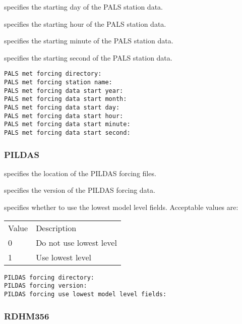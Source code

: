   specifies the starting
 day of the PALS station data.

  specifies the starting
 hour of the PALS station data.

  specifies the starting
 minute of the PALS station data.

  specifies the starting
 second of the PALS station data.
 

 \begin{Verbatim}[frame=single]
PALS met forcing directory:
PALS met forcing station name:
PALS met forcing data start year:
PALS met forcing data start month:
PALS met forcing data start day:
PALS met forcing data start hour:
PALS met forcing data start minute:
PALS met forcing data start second:
 \end{Verbatim}

 
 \subsubsection{PILDAS} \label{sssec:pildas}
 

 
  specifies the location of the
 PILDAS forcing files.

  specifies the version of the
 PILDAS forcing data.

  specifies
 whether to use the lowest model level fields.
 Acceptable values are:

 \begin{tabular}{ll}
 Value & Description             \\
  0    & Do not use lowest level \\
  1    & Use lowest level        \\
 \end{tabular}
 

 \begin{Verbatim}[frame=single]
PILDAS forcing directory:
PILDAS forcing version:
PILDAS forcing use lowest model level fields:
 \end{Verbatim}

 
 \subsubsection{RDHM356} \label{sssec:rdhm356forcing}
 

